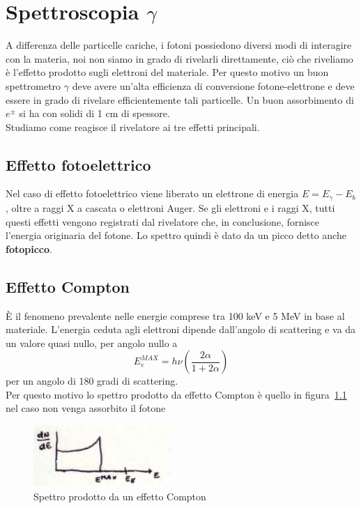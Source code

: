 \chapter{Spettroscopia $\gamma$}
A differenza delle particelle cariche, i fotoni possiedono diversi modi di interagire con la materia, noi non siamo in grado di rivelarli direttamente,
ci\`o che riveliamo \`e l'effetto prodotto sugli elettroni del materiale.
Per questo motivo un buon spettrometro $\gamma$ deve avere un'alta efficienza di conversione fotone-elettrone e deve essere in grado di rivelare efficientemente
tali particelle.
Un buon assorbimento di $e^{\pm}$ si ha con solidi di 1 cm di spessore.\\
Studiamo come reagisce il rivelatore ai tre effetti principali.
\section{Effetto fotoelettrico}
Nel caso di effetto fotoelettrico viene liberato un elettrone di energia $E = E_{\gamma} - E_b$, oltre a raggi X a cascata o elettroni Auger.
Se gli elettroni e i raggi X, tutti questi effetti vengono registrati dal rivelatore che, in conclusione, fornisce l'energia originaria del fotone.
Lo spettro quindi \`e dato da un picco detto anche \textbf{fotopicco}.
\section{Effetto Compton}
\`E il fenomeno prevalente nelle energie comprese tra 100 keV e 5 MeV in base al materiale.
L'energia ceduta agli elettroni dipende dall'angolo di scattering e va da un valore quasi nullo, per angolo nullo a
\begin{equation*}
E_{e}^{MAX} = h \nu \left(\frac{2\alpha}{1 + 2 \alpha} \right)
\end{equation*}
per un angolo di 180 gradi di scattering.\\
Per questo motivo lo spettro prodotto da effetto Compton \`e quello in figura~\ref{fig:spettroCompton} nel caso non venga assorbito il fotone
\begin{figure}[htbp]
\begin{center}
\includegraphics[scale=1]{./Immagini/SpettroCompton.png}
\caption{Spettro prodotto da un effetto Compton}
\label{fig:spettroCompton}
\end{center}
\end{figure}
